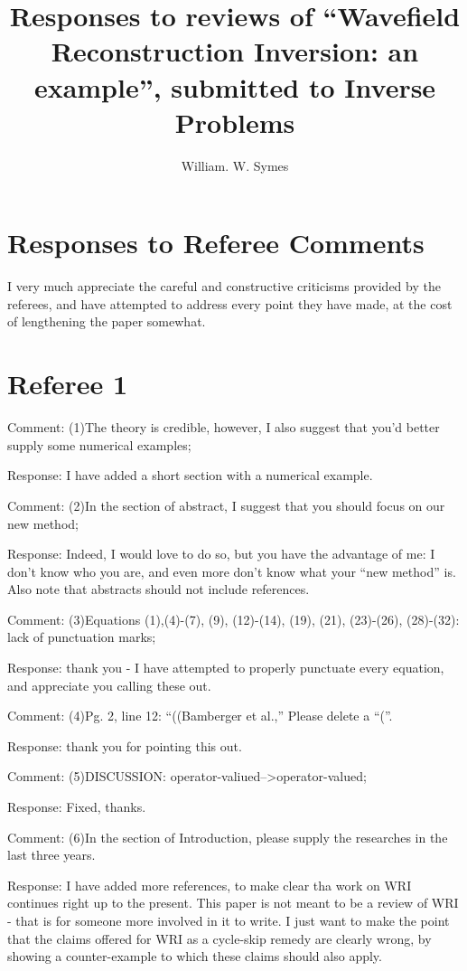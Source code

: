 \address{email: {\tt symes@rice.edu}}
\title{Responses to reviews of ``Wavefield Reconstruction Inversion: an example'', submitted to Inverse Problems}
\author{William. W. Symes}



\section{Responses to Referee Comments}
I very much appreciate the careful and constructive criticisms provided by the referees, and have attempted to address every point they have made, at the cost of lengthening the paper somewhat.

\section{Referee 1}

\noindent Comment: (1)The theory is credible, however, I also suggest that you’d better supply some numerical examples;

\noindent Response: I have added a short section with a numerical example.

\noindent Comment: (2)In the section of abstract, I suggest that you should focus on our new method;

\noindent Response: Indeed, I would love to do so, but you have the advantage of me: I don't know who you are, and even more don't know what your ``new method'' is. Also note that abstracts should not include references.

\noindent Comment: (3)Equations (1),(4)-(7), (9), (12)-(14), (19), (21), (23)-(26), (28)-(32): lack of punctuation marks;

\noindent Response: thank you - I have attempted to properly punctuate every equation, and appreciate you calling these out.

\noindent Comment: (4)Pg. 2, line 12: “((Bamberger et al.,” Please delete a “(”.

\noindent Response: thank you for pointing this out.

\noindent Comment: (5)DISCUSSION: operator-valiued-->operator-valued;

\noindent Response: Fixed, thanks. 

\noindent Comment: (6)In the section of Introduction, please supply the researches in the last three years.

\noindent Response: I have added more references, to make clear tha work on WRI continues right up to the present. This paper is not meant to be a review of WRI - that is for someone more involved in it to write. I just want to make the point that the claims offered for WRI as a cycle-skip remedy are clearly wrong, by showing a counter-example to which these claims should also apply.


